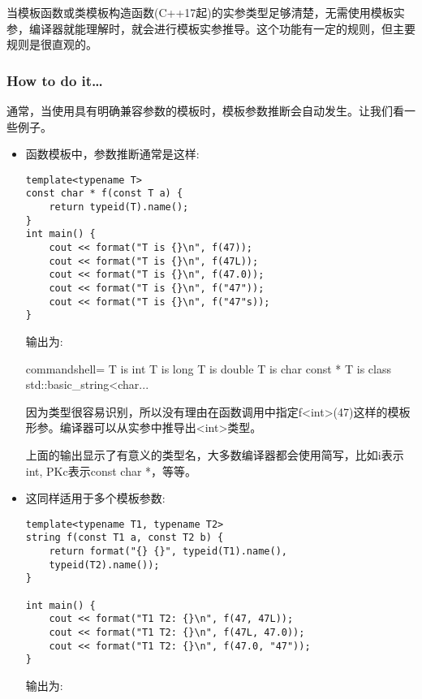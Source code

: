 
当模板函数或类模板构造函数(C++17起)的实参类型足够清楚，无需使用模板实参，编译器就能理解时，就会进行模板实参推导。这个功能有一定的规则，但主要规则是很直观的。

\subsubsection{How to do it…}

通常，当使用具有明确兼容参数的模板时，模板参数推断会自动发生。让我们看一些例子。

\begin{itemize}
\item 
函数模板中，参数推断通常是这样:

\begin{lstlisting}[style=styleCXX]
template<typename T>
const char * f(const T a) {
	return typeid(T).name();
}
int main() {
	cout << format("T is {}\n", f(47));
	cout << format("T is {}\n", f(47L));
	cout << format("T is {}\n", f(47.0));
	cout << format("T is {}\n", f("47"));
	cout << format("T is {}\n", f("47"s));
}
\end{lstlisting}

输出为:

\begin{tcblisting}{commandshell={}}
T is int
T is long
T is double
T is char const *
T is class std::basic_string<char...
\end{tcblisting}

因为类型很容易识别，所以没有理由在函数调用中指定f<int>(47)这样的模板形参。编译器可以从实参中推导出<int>类型。

\begin{tcolorbox}[colback=webgreen!5!white,colframe=webgreen!75!black,title=Note]
上面的输出显示了有意义的类型名，大多数编译器都会使用简写，比如i表示int, PKc表示const char *，等等。
\end{tcolorbox}

\item 
这同样适用于多个模板参数:

\begin{lstlisting}[style=styleCXX]
template<typename T1, typename T2>
string f(const T1 a, const T2 b) {
	return format("{} {}", typeid(T1).name(),
	typeid(T2).name());
}

int main() {
	cout << format("T1 T2: {}\n", f(47, 47L));
	cout << format("T1 T2: {}\n", f(47L, 47.0));
	cout << format("T1 T2: {}\n", f(47.0, "47"));
}
\end{lstlisting}

输出为:


\end{itemize}
